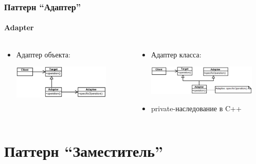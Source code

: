 \documentclass{../../slides-style}
\begin{document}
    \begin{frame}
        \frametitle{Паттерн ``Адаптер''}
        \framesubtitle{Adapter}
        \begin{columns}
            \begin{column}{0.5\textwidth}
                \begin{itemize}
                    \item Адаптер объекта:
                        \vspace{0.3cm}
                        
                        \includegraphics[width=0.8\textwidth]{objectAdapter.png}
                \end{itemize}
            \end{column}
            \begin{column}{0.5\textwidth}
                \begin{itemize}
                    \item Адаптер класса:
                        \vspace{0.3cm}
                        
                        \includegraphics[width=0.9\textwidth]{classAdapter.png}
                        \vspace{0.3cm}
                    \item private-наследование в C++
                \end{itemize}
            \end{column}
        \end{columns}
    \end{frame}

    \section{Паттерн ``Заместитель''}
\end{document}
